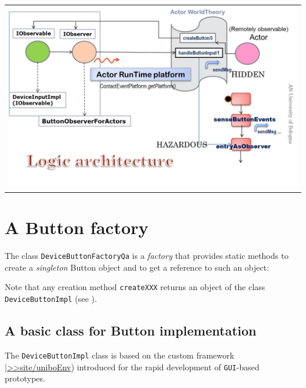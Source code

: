 \medskip
\begin{center}
\begin{tabular}{ c }
     \includegraphics[scale = 0.45]{./img/buttonLogicalArchitecture.jpg}\\
\end{tabular}{   }
\end{center}

\newpage 
\section{A Button factory}
The \java{} class \texttt{DeviceButtonFactoryQa} is a \textit{factory} that provides static methods to create a \textit{singleton} Button object and to get a reference to such an object:



Note that any creation method \texttt{createXXX} returns  an object of the class \texttt{DeviceButtonImpl} (see   ). 

\subsection{A basic class for Button implementation}
The \texttt{DeviceButtonImpl} class is based on the custom framework \href{https://137.204.107.21/syskb/it.unibo.iss2015intro/docs/Frameworks/FramwCustomAppl.html}{|>>site/uniboEnv}) introduced for the rapid development of \texttt{GUI}-based prototypes.


